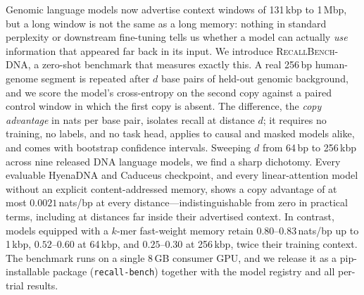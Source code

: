 Genomic language models now advertise context windows of 131\,kbp to 1\,Mbp, but a long
window is not the same as a long memory: nothing in standard perplexity or downstream
fine-tuning tells us whether a model can actually \emph{use} information that appeared far
back in its input. We introduce \textsc{RecallBench-DNA}, a zero-shot benchmark that measures
exactly this. A real 256\,bp human-genome segment is repeated after $d$ base pairs of held-out
genomic background, and we score the model's cross-entropy on the second copy against a paired
control window in which the first copy is absent. The difference, the \emph{copy advantage}
in nats per base pair, isolates recall at distance $d$; it requires no training, no labels,
and no task head, applies to causal and masked models alike, and comes with bootstrap
confidence intervals. Sweeping $d$ from 64\,bp to 256\,kbp across nine released DNA language
models, we find a sharp dichotomy. Every evaluable HyenaDNA and Caduceus checkpoint, and every
linear-attention model without an explicit content-addressed memory, shows a copy advantage
of at most $0.0021$\,nats/bp at every distance---indistinguishable from zero in practical
terms, including at distances far inside their advertised context. In contrast, models
equipped with a $k$-mer fast-weight memory retain $0.80$--$0.83$\,nats/bp up to 1\,kbp,
$0.52$--$0.60$ at 64\,kbp, and $0.25$--$0.30$ at 256\,kbp, twice their training context.
The benchmark runs on a single 8\,GB consumer GPU, and we release it as a pip-installable
package (\texttt{recall-bench}) together with the model registry and all per-trial results.
